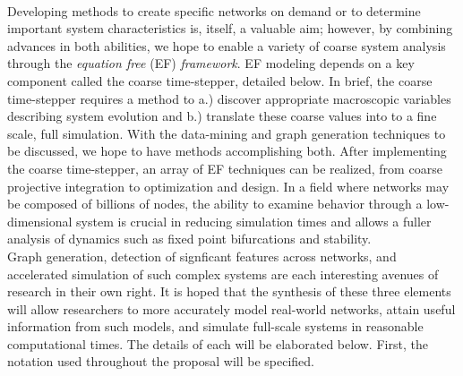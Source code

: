 \documentclass[11pt]{article}
\begin{document}
\vspace{1mm}\\
\indent Developing methods to create specific networks on demand or to determine important system characteristics is, itself, a valuable aim; however, by combining advances in both abilities, we hope to enable a variety of coarse system analysis through the \textit{equation free} (EF) \textit{framework}. EF modeling depends on a key component called the coarse time-stepper, detailed below. In brief, the coarse time-stepper requires a method to a.) discover appropriate macroscopic variables describing system evolution and b.) translate these coarse values into to a fine scale, full simulation. With the data-mining and graph generation techniques to be discussed, we hope to have methods accomplishing both. After implementing the coarse time-stepper, an array of EF techniques can be realized, from coarse projective integration to optimization and design. In a field where networks may be composed of billions of nodes, the ability to examine behavior through a low-dimensional system is crucial in reducing simulation times and allows a fuller analysis of dynamics such as fixed point bifurcations and stability.\vspace{1mm}\\
\indent Graph generation, detection of signficant features across networks, and accelerated simulation of such complex systems are each interesting avenues of research in their own right. It is hoped that the synthesis of these three elements will allow researchers to more accurately model real-world networks, attain useful information from such models, and simulate full-scale systems in reasonable computational times. The details of each will be elaborated below. First, the notation used throughout the proposal will be specified.
\end{document}
